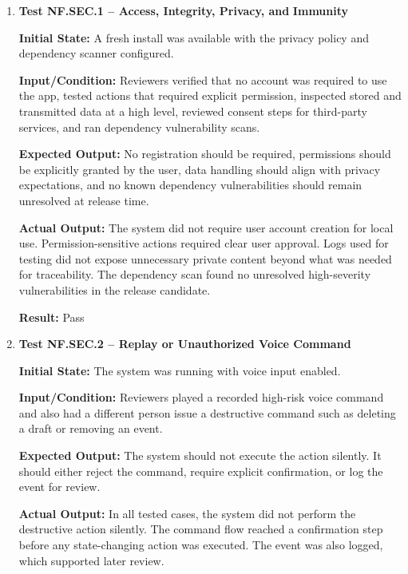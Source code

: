 \documentclass[12pt]{article}
\begin{document}
\begin{enumerate}
    \item \textbf{Test NF.SEC.1 -- Access, Integrity, Privacy, and}
    \textbf{Immunity}
    
    \textbf{Initial State:} A fresh install was available with the
    privacy policy and dependency scanner configured.
    
    \textbf{Input/Condition:} Reviewers verified that no account was
    required to use the app, tested actions that required explicit
    permission, inspected stored and transmitted data at a high level,
    reviewed consent steps for third-party services, and ran dependency
    vulnerability scans.
    
    \textbf{Expected Output:} No registration should be required,
    permissions should be explicitly granted by the user, data handling
    should align with privacy expectations, and no known dependency
    vulnerabilities should remain unresolved at release time.
    
    \textbf{Actual Output:} The system did not require user account
    creation for local use. Permission-sensitive actions required clear
    user approval. Logs used for testing did not expose unnecessary
    private content beyond what was needed for traceability. The
    dependency scan found no unresolved high-severity vulnerabilities
    in the release candidate.
    
    \textbf{Result:} Pass

    \item \textbf{Test NF.SEC.2 -- Replay or Unauthorized Voice Command}
    
    \textbf{Initial State:} The system was running with voice input
    enabled.
    
    \textbf{Input/Condition:} Reviewers played a recorded high-risk
    voice command and also had a different person issue a destructive
    command such as deleting a draft or removing an event.
    
    \textbf{Expected Output:} The system should not execute the action
    silently. It should either reject the command, require explicit
    confirmation, or log the event for review.
    
    \textbf{Actual Output:} In all tested cases, the system did not
    perform the destructive action silently. The command flow reached a
    confirmation step before any state-changing action was executed.
    The event was also logged, which supported later review.
    

\end{enumerate}
\end{document}
